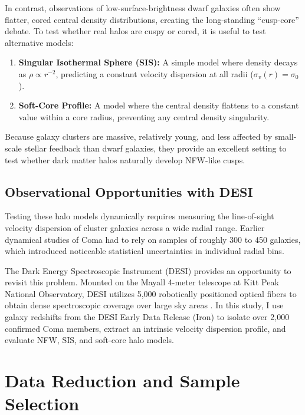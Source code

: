 \documentclass[twocolumn]{aastex631}
\begin{document}
In contrast, observations of low-surface-brightness dwarf galaxies often show flatter, cored central density distributions, creating the long-standing ``cusp-core'' debate. To test whether real halos are cuspy or cored, it is useful to test alternative models:
\begin{enumerate}
	\item \textbf{Singular Isothermal Sphere (SIS):} A simple model where density decays as $\rho \propto r^{-2}$, predicting a constant velocity dispersion at all radii ($\sigma_v(r) = \sigma_0$).
	\item \textbf{Soft-Core Profile:} A model where the central density flattens to a constant value within a core radius, preventing any central density singularity.
\end{enumerate}
Because galaxy clusters are massive, relatively young, and less affected by small-scale stellar feedback than dwarf galaxies, they provide an excellent setting to test whether dark matter halos naturally develop NFW-like cusps.

\subsection{Observational Opportunities with DESI}
Testing these halo models dynamically requires measuring the line-of-sight velocity dispersion of cluster galaxies across a wide radial range. Earlier dynamical studies of Coma \citep[e.g.,][]{kent1982, lokas2003} had to rely on samples of roughly 300 to 450 galaxies, which introduced noticeable statistical uncertainties in individual radial bins.

The Dark Energy Spectroscopic Instrument (DESI) provides an opportunity to revisit this problem. Mounted on the Mayall 4-meter telescope at Kitt Peak National Observatory, DESI utilizes 5,000 robotically positioned optical fibers to obtain dense spectroscopic coverage over large sky areas \citep{desi2023}. In this study, I use galaxy redshifts from the DESI Early Data Release (Iron) to isolate over 2,000 confirmed Coma members, extract an intrinsic velocity dispersion profile, and evaluate NFW, SIS, and soft-core halo models.

\section{Data Reduction and Sample Selection} \label{sec:sample_selection}
\end{document}
